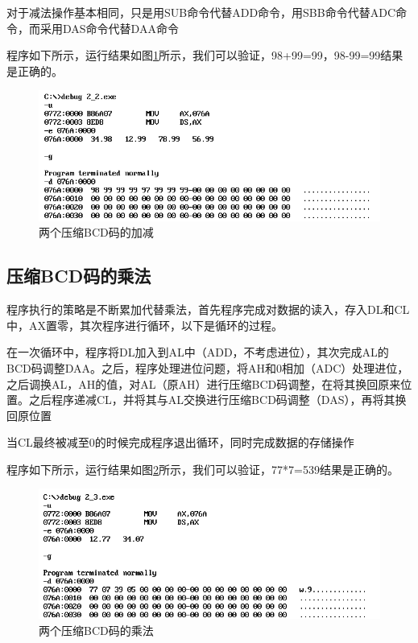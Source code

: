 \documentclass[UTF8,a4paper]{ctexart}
\begin{document}
对于减法操作基本相同，只是用SUB命令代替ADD命令，用SBB命令代替ADC命令，而采用DAS命令代替DAA命令

程序如下所示，运行结果如图\ref{p211}所示，我们可以验证，98+99=99，98-99=99结果是正确的。 



\begin{figure}[b]
\centering
\includegraphics[width=\textwidth]{p211.png}
\caption{两个压缩BCD码的加减}
\label{p211}
\end{figure}
\clearpage
\subsection{压缩BCD码的乘法}
程序执行的策略是不断累加代替乘法，首先程序完成对数据的读入，存入DL和CL中，AX置零，其次程序进行循环，以下是循环的过程。

在一次循环中，程序将DL加入到AL中（ADD，不考虑进位），其次完成AL的BCD码调整DAA。之后，程序处理进位问题，将AH和0相加（ADC）处理进位，之后调换AL，AH的值，对AL（原AH）进行压缩BCD码调整，在将其换回原来位置。之后程序递减CL，并将其与AL交换进行压缩BCD码调整（DAS），再将其换回原位置

当CL最终被减至0的时候完成程序退出循环，同时完成数据的存储操作

程序如下所示，运行结果如图\ref{p22}所示，我们可以验证，77*7=539结果是正确的。
 


\begin{figure}[b]
\centering
\includegraphics[width=\textwidth]{p22.png}
\caption{两个压缩BCD码的乘法}
\label{p22}
\end{figure}
\clearpage
\end{document}
